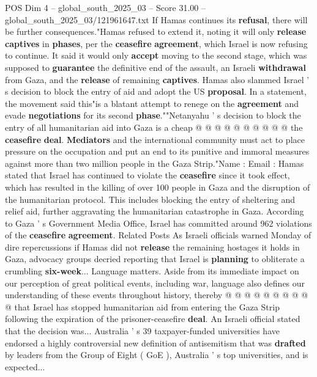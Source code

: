 \begin{textsample}{POS Dim 4 – global\_south\_2025\_03 – Score 31.00 – global\_south\_2025\_03/121961647.txt}
If Hamas continues its \textbf{refusal}, there will be further consequences."Hamas refused to extend it, noting it will only \textbf{release} \textbf{captives} in \textbf{phases}, per the \textbf{ceasefire} \textbf{agreement}, which Israel is now refusing to continue.
It said it would only \textbf{accept} moving to the second stage, which was supposed to \textbf{guarantee} the definitive end of the assault, an Israeli \textbf{withdrawal} from Gaza, and the \textbf{release} of remaining \textbf{captives}.
Hamas also slammed Israel ' s decision to block the entry of aid and adopt the US \textbf{proposal}.
In a statement, the movement said this"is a blatant attempt to renege on the \textbf{agreement} and evade \textbf{negotiations} for its second \textbf{phase}.""Netanyahu ' s decision to block the entry of all humanitarian aid into Gaza is a cheap @ @ @ @ @ @ @ @ @ @ the \textbf{ceasefire} \textbf{deal}. \textbf{Mediators} and the international community must act to place pressure on the occupation and put an end to its punitive and immoral measures against more than two million people in the Gaza Strip."Name : Email : Hamas stated that Israel has continued to violate the \textbf{ceasefire} since it took effect, which has resulted in the killing of over 100 people in Gaza and the disruption of the humanitarian protocol.
This includes blocking the entry of sheltering and relief aid, further aggravating the humanitarian catastrophe in Gaza.
According to Gaza ' s Government Media Office, Israel has committed around 962 violations of the \textbf{ceasefire} \textbf{agreement}.
Related Posts As Israeli officials warned Monday of dire repercussions if Hamas did not \textbf{release} the remaining hostages it holds in Gaza, advocacy groups decried reporting that Israel is \textbf{planning} to obliterate a crumbling \textbf{six-week}...
Language matters.
Aside from its immediate impact on our perception of great political events, including war, language also defines our understanding of these events throughout history, thereby @ @ @ @ @ @ @ @ @ @ that Israel has stopped humanitarian aid from entering the Gaza Strip following the expiration of the prisoner-ceasefire \textbf{deal}.
An Israeli official stated that the decision was...
Australia ' s 39 taxpayer-funded universities have endorsed a highly controversial new definition of antisemitism that was \textbf{drafted} by leaders from the Group of Eight ( GoE ), Australia ' s top universities, and is expected...

\end{textsample}
